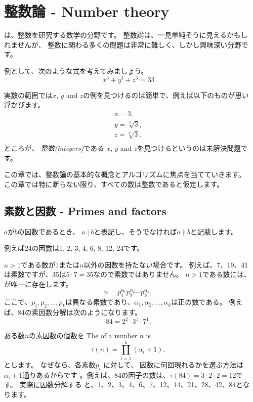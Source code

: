 \chapter{整数論 - Number theory}


は、整数を研究する数学の分野です。
整数論は、一見単純そうに見えるかもしれませんが、
整数に関わる多くの問題は非常に難しく、しかし興味深い分野です。

例として、次のような式を考えてみましょう。
\[x^3 + y^3 + z^3 = 33\]

実数の範囲では$x$, $y$ and $z$の例を見つけるのは簡単で、例えば以下のものが思い浮かびます。
\[
\begin{array}{lcl}
x = 3, \\
y = \sqrt[3]{3}, \\
z = \sqrt[3]{3}.\\
\end{array}
\]
ところが、
\emph{整数(integers)}である $x$, $y$ and $z$を見つけるというのは未解決問題です。\cite{bec07}

この章では、整数論の基本的な概念とアルゴリズムに焦点を当てていきます。
この章では特に断らない限り、すべての数は整数であると仮定します。

\section{素数と因数 - Primes and factors}



$a$が$b$の因数であるとき、 $a \mid b$と表記し、そうでなければ$a \nmid b$と記載します。

例えば24の因数は1, 2, 3, 4, 6, 8, 12, 24です。


$n>1$である数が1または$n$以外の因数を持たない場合です。
例えば、7、19、41は素数ですが、35は$5 \cdot 7 = 35$なので素数ではありません。
$n>1$である数には、が唯一に存在します。
\[ n = p_1^{\alpha_1} p_2^{\alpha_2} \cdots p_k^{\alpha_k},\]
ここで、$p_1,p_2,\ldots,p_k$は異なる素数であり、$\alpha_1,\alpha_2,\ldots,\alpha_k$は正の数である。
例えば、84の素因数分解は次のようになります。
\[84 = 2^2 \cdot 3^1 \cdot 7^1.\]

ある数$n$の素因数の個数を
The  of a number $n$ is
\[\tau(n)=\prod_{i=1}^k (\alpha_i+1),\]
とします。
なぜなら、各素数$p_i$ に対して、
因数に何回現れるかを選ぶ方法は$\alpha_i+1$通りあるからです
。例えば、84の因子の数は、$\tau(84)=3 \cdot 2 \cdot 2 = 12$です。
実際に因数分解する と、1、2、3、4、6、7、12、14、21、28、42、84となります。

